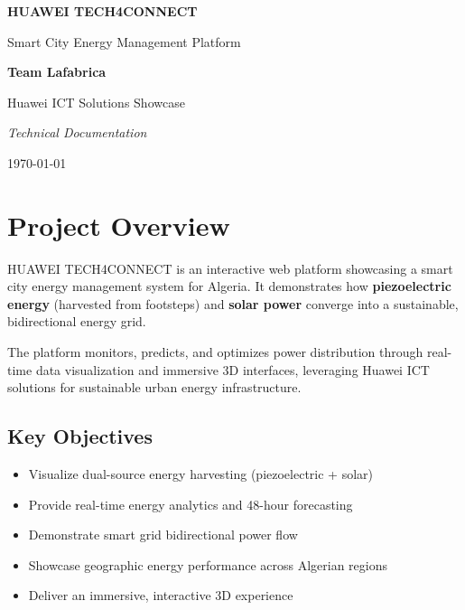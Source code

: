 \documentclass[12pt,a4paper]{article}
\begin{document}
\begin{titlepage}
    \centering
    \vspace*{3cm}
    {\Huge\bfseries\textcolor{huaweiRed}{HUAWEI TECH4CONNECT}\par}
    \vspace{0.5cm}
    {\Large Smart City Energy Management Platform\par}
    \vspace{2cm}
    {\large\textbf{Team Lafabrica}\par}
    \vspace{0.5cm}
    {\large Huawei ICT Solutions Showcase\par}
    \vspace{3cm}
    {\large\textit{Technical Documentation}\par}
    \vspace{1cm}
    {\large \today\par}
    \vfill
\end{titlepage}

\tableofcontents
\newpage

\section{Project Overview}

HUAWEI TECH4CONNECT is an interactive web platform showcasing a smart city energy management system for Algeria. It demonstrates how \textbf{piezoelectric energy} (harvested from footsteps) and \textbf{solar power} converge into a sustainable, bidirectional energy grid.

The platform monitors, predicts, and optimizes power distribution through real-time data visualization and immersive 3D interfaces, leveraging Huawei ICT solutions for sustainable urban energy infrastructure.

\subsection{Key Objectives}
\begin{itemize}
    \item Visualize dual-source energy harvesting (piezoelectric + solar)
    \item Provide real-time energy analytics and 48-hour forecasting
    \item Demonstrate smart grid bidirectional power flow
    \item Showcase geographic energy performance across Algerian regions
    \item Deliver an immersive, interactive 3D experience
\end{itemize}
\end{document}
